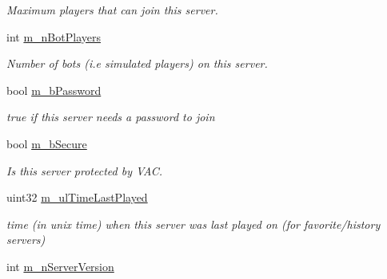 \begin{DoxyCompactItemize}
\begin{DoxyCompactList}\small\item\em Maximum players that can join this server. \end{DoxyCompactList}\item 
\mbox{\label{classgameserveritem__t_aadadb40a792ad18178e76d5b6b1dc909}} 
int \hyperlink{classgameserveritem__t_aadadb40a792ad18178e76d5b6b1dc909}{m\+\_\+n\+Bot\+Players}
\begin{DoxyCompactList}\small\item\em Number of bots (i.\+e simulated players) on this server. \end{DoxyCompactList}\item 
\mbox{\label{classgameserveritem__t_a2c9ff8bc276f576d63f8850288aa06cc}} 
bool \hyperlink{classgameserveritem__t_a2c9ff8bc276f576d63f8850288aa06cc}{m\+\_\+b\+Password}
\begin{DoxyCompactList}\small\item\em true if this server needs a password to join \end{DoxyCompactList}\item 
\mbox{\label{classgameserveritem__t_a3e4cc5a7f31facaf4218329a00888600}} 
bool \hyperlink{classgameserveritem__t_a3e4cc5a7f31facaf4218329a00888600}{m\+\_\+b\+Secure}
\begin{DoxyCompactList}\small\item\em Is this server protected by V\+AC. \end{DoxyCompactList}\item 
\mbox{\label{classgameserveritem__t_a2ba4be71a125c17e9f7dfb4443895f6b}} 
uint32 \hyperlink{classgameserveritem__t_a2ba4be71a125c17e9f7dfb4443895f6b}{m\+\_\+ul\+Time\+Last\+Played}
\begin{DoxyCompactList}\small\item\em time (in unix time) when this server was last played on (for favorite/history servers) \end{DoxyCompactList}\item 
\mbox{\label{classgameserveritem__t_a1e6dbc6ed4bb005fc549fae132779b3f}} 
int \hyperlink{classgameserveritem__t_a1e6dbc6ed4bb005fc549fae132779b3f}{m\+\_\+n\+Server\+Version}

\end{DoxyCompactItemize}
